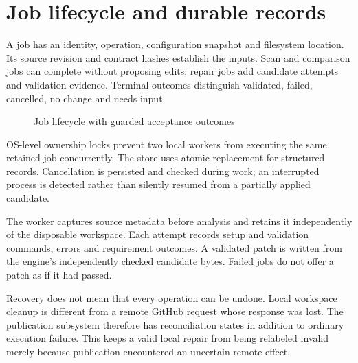 \documentclass[12pt,a4paper,oneside]{report}
\begin{document}
\section{Job lifecycle and durable records}

A job has an identity, operation, configuration snapshot and filesystem location. Its source revision and contract hashes establish the inputs. Scan and comparison jobs can complete without proposing edits; repair jobs add candidate attempts and validation evidence. Terminal outcomes distinguish validated, failed, cancelled, no change and needs input.

\begin{figure}[htbp]\centering
{}
\caption{Job lifecycle with guarded acceptance outcomes}\label{fig:4.2}
\end{figure}

OS-level ownership locks prevent two local workers from executing the same retained job concurrently. The store uses atomic replacement for structured records. Cancellation is persisted and checked during work; an interrupted process is detected rather than silently resumed from a partially applied candidate.

The worker captures source metadata before analysis and retains it independently of the disposable workspace. Each attempt records setup and validation commands, errors and requirement outcomes. A validated patch is written from the engine's independently checked candidate bytes. Failed jobs do not offer a patch as if it had passed.

Recovery does not mean that every operation can be undone. Local workspace cleanup is different from a remote GitHub request whose response was lost. The publication subsystem therefore has reconciliation states in addition to ordinary execution failure. This keeps a valid local repair from being relabeled invalid merely because publication encountered an uncertain remote effect.
\end{document}
